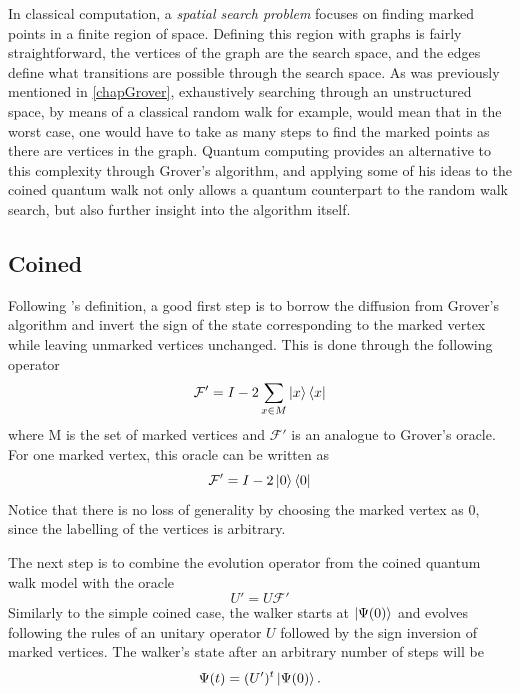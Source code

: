\documentclass[../../dissertation.tex]{subfiles}
\begin{document}
In classical computation, a \textit{spatial search problem} focuses on finding marked points in a finite region of space. Defining this region with graphs is fairly straightforward, the vertices of the graph are the search space, and the edges define what transitions are possible through the search space. As was previously mentioned in \ref{chapGrover}, exhaustively searching through an unstructured space, by means of a classical random walk for example, would mean that in the worst case, one would have to take as many steps to find the marked points as there are vertices in the graph. Quantum computing provides an alternative to this complexity through Grover's algorithm, and applying some of his ideas to the coined quantum walk not only allows a quantum counterpart to the random walk search, but also further insight into the algorithm itself.\par
\subsection{Coined}
Following \cite{REN1}'s definition, a good first step is to borrow the diffusion from Grover's algorithm and invert the sign of the state corresponding to the marked vertex while leaving unmarked vertices unchanged. This is done through the following operator 
\begin{equation}
	\mathcal{F'} = I - 2 \sum_{x\in M} \ket{x}\bra{x}
\end{equation}
where M is the set of marked vertices and $\mathcal{F'}$ is an analogue to Grover's oracle. For one marked vertex, this oracle can be written as 
\begin{equation}
	\mathcal{F'} = I - 2 \ket{0}\bra{0}
\end{equation}
Notice that there is no loss of generality by choosing the marked vertex as $0$, since the labelling of the vertices is arbitrary.\par
The next step is to combine the evolution operator from the coined quantum walk model with the oracle
\begin{equation}
	U'= U\mathcal{F'}
	\label{eq:43}
\end{equation}
Similarly to the simple coined case, the walker starts at $\ket{\Psi(0)}$ and evolves following the rules of an unitary operator $U$ followed by the sign inversion of marked vertices. The walker's state after an arbitrary number of steps will be
\begin{equation}
	\Psi(t) = (U')^t\ket{\Psi(0)}.
	\label{eq:sysStateSearch}
\end{equation}\par
\end{document}
